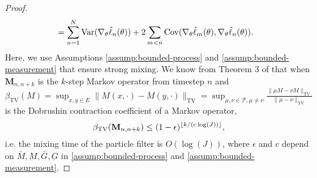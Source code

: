 \begin{proof}
\begin{align*}
    &= \sum_{n=1}^N \mathrm{Var}(\nabla_\theta\hat\ell_n(\theta)) + 2\sum_{m<n} \mathrm{Cov}(\nabla_\theta\hat\ell_m(\theta),\nabla_\theta\hat\ell_n(\theta)).
\end{align*}
Here, we use Assumptions \ref{assump:bounded-process} and \ref{assump:bounded-measurement} that ensure strong mixing. We know from Theorem 3 of \cite{karjalainen23} that when $\textbf{M}_{n,n+k}$ is the $k$-step Markov operator from timestep $n$ and $\beta_{\text{TV}}(M) = \sup _{x, y \in E}\|M(x, \cdot)-M(y, \cdot)\|_{\mathrm{TV}}=\sup _{\mu, \nu \in \mathcal{P}, \mu \neq \nu} \frac{\|\mu M-\nu M\|_{\mathrm{TV}}}{\|\mu-\nu\|_{\mathrm{TV}}}$ is the Dobrushin contraction coefficient of a Markov operator, 
$$\beta_{\text{TV}}(\textbf{M}_{n,n+k}) \leq (1-\epsilon)^{\lfloor k/(c\log(J)) \rfloor},$$
i.e. the mixing time of the particle filter is $O(\log(J))$, where $\epsilon$ and $c$ depend on $\bar{M}, \underbar{M}, \bar{G}, \underbar{G}$ in \ref{assump:bounded-process} and \ref{assump:bounded-measurement}. 



\end{proof}
